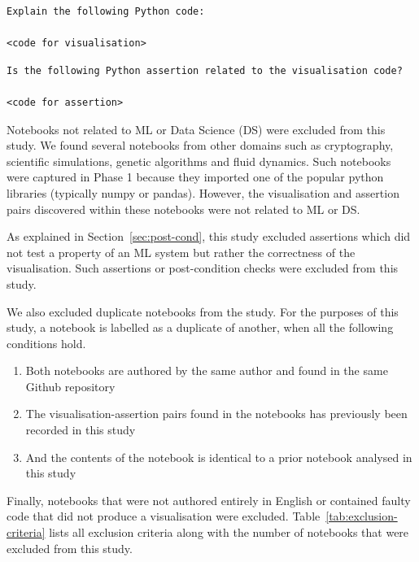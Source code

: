 \documentclass[conference]{IEEEtran}
\begin{document}
\begin{lstlisting}[caption={Prompt used for ChatGPT 4.0 model to understand visualisation code.}, label={lst:prompt}]
Explain the following Python code:

<code for visualisation>

\end{lstlisting}

\begin{lstlisting}[caption={Prompt used for ChatGPT 4.0 model to confirm if a VA pair are related to each other.}, label={lst:prompt-follow-up}]
Is the following Python assertion related to the visualisation code?

<code for assertion>

\end{lstlisting}

Notebooks not related to ML or Data Science (DS) were excluded from this study. We found several notebooks from other domains such as cryptography, scientific simulations, genetic algorithms and fluid dynamics. Such notebooks were captured in Phase 1 because they imported one of the popular python libraries (typically numpy or pandas). However, the visualisation and assertion pairs discovered within these notebooks were not related to ML or DS.

As explained in Section~\ref{sec:post-cond}, this study excluded assertions which did not test a property of an ML system but rather the correctness of the visualisation. Such assertions or post-condition checks were excluded from this study.

We also excluded duplicate notebooks from the study. For the purposes of this study, a notebook is labelled as a duplicate of another, when all the following conditions hold.

\begin{enumerate}
  \item Both notebooks are authored by the same author and found in the same Github repository
  \item The visualisation-assertion pairs found in the notebooks has previously been recorded in this study
  \item And the contents of the notebook is identical to a prior notebook analysed in this study
\end{enumerate}

Finally, notebooks that were not authored entirely in English or contained faulty code that did not produce a visualisation were excluded. Table~\ref{tab:exclusion-criteria} lists all exclusion criteria along with the number of notebooks that were excluded from this study.
\end{document}
